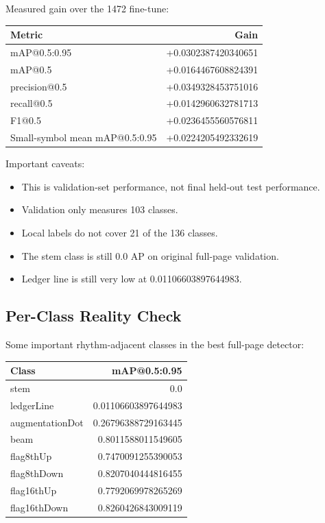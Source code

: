 \documentclass[11pt]{article}
\begin{document}
Measured gain over the 1472 fine-tune:

\begin{center}
\begin{tabular}{lr}
\toprule
\textbf{Metric} & \textbf{Gain}\\
\midrule
mAP@0.5:0.95 & +0.0302387420340651\\
mAP@0.5 & +0.0164467608824391\\
precision@0.5 & +0.0349328453751016\\
recall@0.5 & +0.0142960632781713\\
F1@0.5 & +0.0236455560576811\\
Small-symbol mean mAP@0.5:0.95 & +0.0224205492332619\\
\bottomrule
\end{tabular}
\end{center}

Important caveats:

\begin{itemize}
  \item This is validation-set performance, not final held-out test performance.
  \item Validation only measures 103 classes.
  \item Local labels do not cover 21 of the 136 classes.
  \item The stem class is still 0.0 AP on original full-page validation.
  \item Ledger line is still very low at 0.01106603897644983.
\end{itemize}

\subsection{Per-Class Reality Check}

Some important rhythm-adjacent classes in the best full-page detector:

\begin{center}
\begin{tabular}{lr}
\toprule
\textbf{Class} & \textbf{mAP@0.5:0.95}\\
\midrule
stem & 0.0\\
ledgerLine & 0.01106603897644983\\
augmentationDot & 0.26796388729163445\\
beam & 0.8011588011549605\\
flag8thUp & 0.7470091255390053\\
flag8thDown & 0.8207040444816455\\
flag16thUp & 0.7792069978265269\\
flag16thDown & 0.8260426843009119\\
\bottomrule
\end{tabular}
\end{center}
\end{document}
